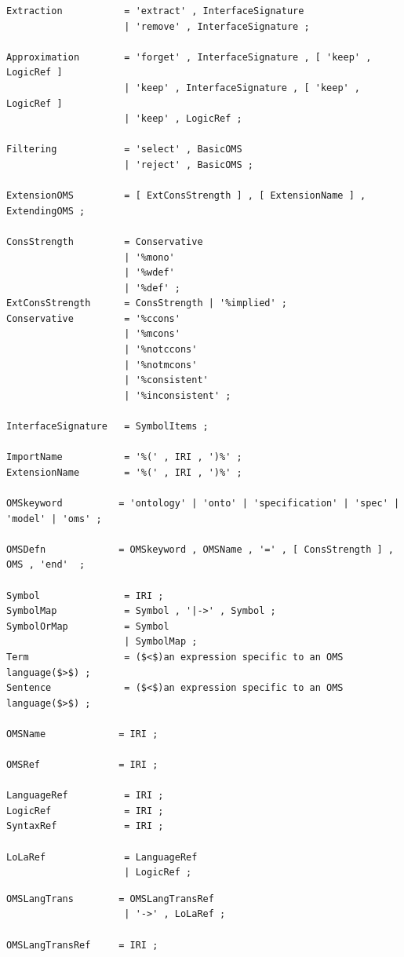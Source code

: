 \documentclass[10pt,fleqn,%
\ifpretendfinal
final%
\else
draft%
\fi,
]{scrreprt}
\begin{document}
\begin{lstlisting}[language=ebnf,escapeinside={()},mathescape]
Extraction           = 'extract' , InterfaceSignature
                     | 'remove' , InterfaceSignature ;

Approximation        = 'forget' , InterfaceSignature , [ 'keep' , LogicRef ] 
                     | 'keep' , InterfaceSignature , [ 'keep' , LogicRef ] 
                     | 'keep' , LogicRef ;

Filtering            = 'select' , BasicOMS 
                     | 'reject' , BasicOMS ;

ExtensionOMS         = [ ExtConsStrength ] , [ ExtensionName ] , ExtendingOMS ;

ConsStrength         = Conservative
                     | '%mono'
                     | '%wdef'
                     | '%def' ;
ExtConsStrength      = ConsStrength | '%implied' ;
Conservative         = '%ccons'
                     | '%mcons'  
                     | '%notccons'  
                     | '%notmcons'  
                     | '%consistent'  
                     | '%inconsistent' ; 

InterfaceSignature   = SymbolItems ;

ImportName           = '%(' , IRI , ')%' ;
ExtensionName        = '%(' , IRI , ')%' ;

OMSkeyword          = 'ontology' | 'onto' | 'specification' | 'spec' | 'model' | 'oms' ;

OMSDefn             = OMSkeyword , OMSName , '=' , [ ConsStrength ] , OMS , 'end'  ; 

Symbol               = IRI ;
SymbolMap            = Symbol , '|->' , Symbol ;
SymbolOrMap          = Symbol
                     | SymbolMap ;
Term                 = ($<$)an expression specific to an OMS language($>$) ;
Sentence             = ($<$)an expression specific to an OMS language($>$) ;

OMSName             = IRI ;

OMSRef              = IRI ;

LanguageRef          = IRI ;
LogicRef             = IRI ;
SyntaxRef            = IRI ;

LoLaRef              = LanguageRef
                     | LogicRef ;
\end{lstlisting}

\begin{lstlisting}[language=ebnf,mathescape]
OMSLangTrans        = OMSLangTransRef
                     | '->' , LoLaRef ;

OMSLangTransRef     = IRI ;
\end{lstlisting}
\end{document}
